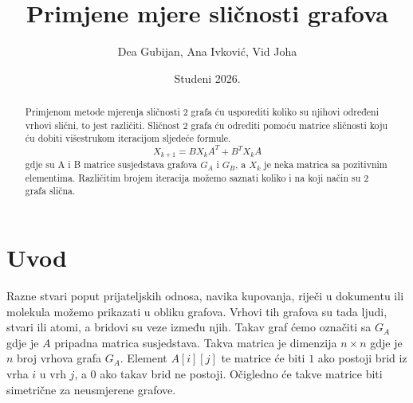 \documentclass[12pt, letterpaper]{article}
\title{Primjene mjere sličnosti grafova}
\author{Dea Gubijan, Ana Ivković, Vid Joha}
\date{Studeni 2026.}
\numberwithin{figure}{section}
\begin{document}
\maketitle
\begin{abstract}
Primjenom metode mjerenja sličnosti 2 grafa ću usporediti koliko su njihovi određeni vrhovi slični, to jest različiti. Sličnost 2 grafa ću odrediti pomoću matrice sličnosti koju ću dobiti višestrukom iteracijom sljedeće formule.\[X_{k+1} = BX_kA^T + B^TX_kA\] gdje su A i B matrice susjedstava grafova $G_A$ i $G_B$, a $X_k$ je neka matrica sa pozitivnim elementima.
Različitim brojem iteracija možemo saznati koliko i na koji način su 2 grafa slična.
\end{abstract}

\section{Uvod}
Razne stvari poput prijateljskih odnosa, navika kupovanja, riječi u dokumentu ili molekula možemo prikazati u obliku grafova. Vrhovi tih grafova su tada ljudi, stvari ili atomi, a bridovi su veze između njih. Takav graf ćemo označiti sa $G_A$ gdje je $A$ pripadna matrica susjedstava. Takva matrica je dimenzija $n\times{n}$ gdje je $n$ broj vrhova grafa $G_A$. Element $A[i][j]$ te matrice će biti $1$ ako postoji brid iz vrha $i$ u vrh $j$, a $0$ ako takav brid ne postoji. Očigledno će takve matrice biti simetrične za neusmjerene grafove. 
\end{document}
